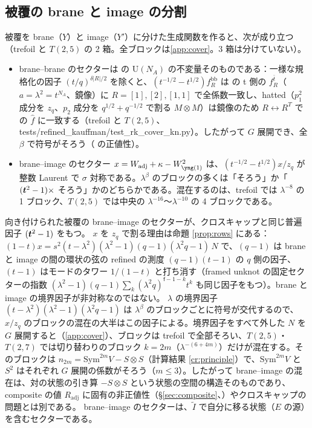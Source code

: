 \subsection{被覆の brane と image の分割}\label{sec:split}
被覆を brane（$Y$）と image（$Y'$）に分けた生成関数を作ると、次が成り立つ（trefoil と $T(2,5)$ の 2 箱。全ブロックは\ref{app:cover}。3 箱は分けていない）。
\begin{itemize}
\item brane--brane のセクターは \cite{KN17} の U$(N_A)$ の不変量そのものである：一様な規格化の因子 $(t/q)^{\delta|R|/2}$ を除くと、$(t^{-1/2} - t^{1/2}) f^{\mathrm{bb}}_R$ は \cite{KN17} の t 側の $f^{\bar t}_R$（$a = \lambda^2 = t^{N_A}$、鏡像）に $R = [1], [2], [1,1]$ で全係数一致し、hatted（$p_1^2$ 成分を $z_q$、$p_2$ 成分を $q^{1/2} + q^{-1/2}$ で割る $M \otimes M$）は鏡像のため $R \leftrightarrow R^T$ で \cite{KN17} の $\hat f$ に一致する（trefoil と $T(2,5)$、tests/refined\_kauffman/test\_rk\_cover\_kn.py）。したがって $G$ 展開でき、全 $\beta$ で符号がそろう（\cite{KN17} の正値性）。
\item brane--image のセクター $x = W_{\mathrm{adj}} + \kappa - W_{\yone}^2$ は、$(t^{-1/2} - t^{1/2})x/z_q$ が整数 Laurent で $\sigma$ 対称である。$\lambda^\beta$ のブロックの多くは「そろう」か「$(\bm{t}^2 - 1)\times$ そろう」かのどちらかである。混在するのは、trefoil では $\lambda^{-8}$ の 1 ブロック、$T(2,5)$ では中央の $\lambda^{-16}$〜$\lambda^{-10}$ の 4 ブロックである。
\end{itemize}
向き付けられた被覆の brane--image のセクターが、クロスキャップと同じ普遍因子 $(\bm{t}^2 - 1)$ をもつ。
$x$ を $z_q$ で割る理由は命題 \ref{prop:rows} にある：$(1-t)x = s^2(t - \lambda^2)(\lambda^2 - 1)(q - 1)(\lambda^2 q - 1)\,N$ で、$(q-1)$ は brane と image の間の環状の弦の refined の測度 $(q-1)(t-1)$ の $q$ 側の因子、$(t-1)$ はモードのタワー $1/(1-t)$ と打ち消す（framed unknot の固定セクターの指数 $(\lambda^2-1)(q-1)\sum_k(\lambda^2q)^{\mathsf f-1-k}t^k$ も同じ因子をもつ）。brane と image の境界因子が非対称なのではない。
$\lambda$ の境界因子 $(t-\lambda^2)(\lambda^2-1)(\lambda^2q-1)$ は $\lambda^\beta$ のブロックごとに符号が交代するので、$x/z_q$ のブロックの混在の大半はこの因子による。境界因子をすべて外した $N$ を $G$ 展開すると（\ref{app:cover}）、ブロックは trefoil で全部そろい、$T(2,5)$・$T(2,7)$ では切り替わりのブロック $k = 2m$（$\lambda^{-(6+4m)}$）だけが混在する。そのブロックは $n_{2m} = \mathrm{Sym}^{2m}V - S\otimes S$（計算結果 \ref{cr:principle}）で、$\mathrm{Sym}^{2m}V$ と $S^2$ はそれぞれ $G$ 展開の係数がそろう（$m \le 3$）。したがって brane--image の混在は、対の状態の引き算 $-S\otimes S$ という状態の空間の構造そのものであり、composite の値 $R_{\mathrm{adj}}$ に固有の非正値性（§\ref{sec:composite}、\cite{CE15}）やクロスキャップの問題とは別である。
brane--image のセクターは、$\tilde I$ で自分に移る状態（$E$ の源）を含むセクターである。

